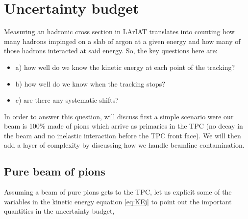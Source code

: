 \begin{figure}
\end{figure}






\chapter{Uncertainty budget}
Measuring an hadronic cross section  in LArIAT translates into counting how many hadrons impinged on a slab of argon at a given energy and how many of those hadrons interacted at said energy. So, the key questions here are:
\begin{itemize}
\item[]a) how well do we know the kinetic energy at each point of the tracking? %
\item[]b) how well do we know when the tracking stops? %
\item[]c) are there any systematic shifts?
\end{itemize}

In order to answer this question, will discuss first a simple scenario  were our beam is 100\% made of pions which arrive as primaries in the TPC (no decay in the beam and no inelastic interaction before the TPC front face). We will then add a layer of complexity by discussing how we handle beamline contamination.

\section{Pure beam of pions}
Assuming a beam of pure pions gets to the TPC, let us explicit some of the variables in the kinetic energy equation \ref{eq:KEj}  to point out the important quantities in the uncertainty budget,

